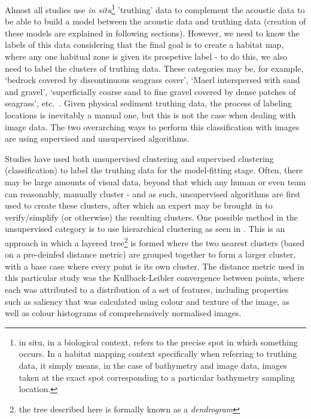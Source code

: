  Almost all studies use \textit{in situ}\footnote{in situ, in a biological context, refers to the precise spot in which something occurs. In a habitat mapping context specifically when referring to truthing data, it simply means, in the case of bathymetry and image data, images taken at the exact spot corresponding to a particular bathymetry sampling location.} 'truthing' data to complement the acoustic data to be able to build a model between the acoustic data and truthing data (creation of these models are explained in following sections). However, we need to know the labels of this data considering that the final goal is to create a habitat map, where any one habitual zone is given its prospetive label - to do this, we also need to label the clusters of truthing data. These categories may be, for example, `bedrock covered by discontinuous seagrass cover', `Maerl interspersed with sand and gravel', `superficially coarse sand to fine gravel covered by dense patches of seagrass', etc.~\citep{micallef12}. Given physical sediment truthing data, the process of labeling locations is inevitably a manual one, but this is not the case when dealing with image data. The two overarching ways to perform this classification with images are using supervised and unsupervised algorithms.

Studies have used both unsupervised clustering and supervised clustering (classification) to label the truthing data for the model-fitting stage. Often, there may be large amounts of visual data, beyond that which any human or even team can reasonably, manually cluster - and as such, unsupervised algorithms are first used to create these clusters, after which an expert may be brought in to verify/simplify (or otherwise) the resulting clusters. One possible method in the unsupervised category is to use hierarchical clustering as seen in \citet{pizarro09}. This is an approach in which a layered tree\footnote{the tree described here is formally known as a \textit{dendrogram}} is formed where the two nearest clusters (based on a pre-deinfed distance metric) are grouped together to form a larger cluster, with a base case where every point is its own cluster. The distance metric used in this particular study was the Kullback-Leibler convergence between points, where each was attributed to a distribution of a set of features, including properties such as saliency that was calculated using colour and texture of the image, as well as colour histograms of comprehensively normalised images.

